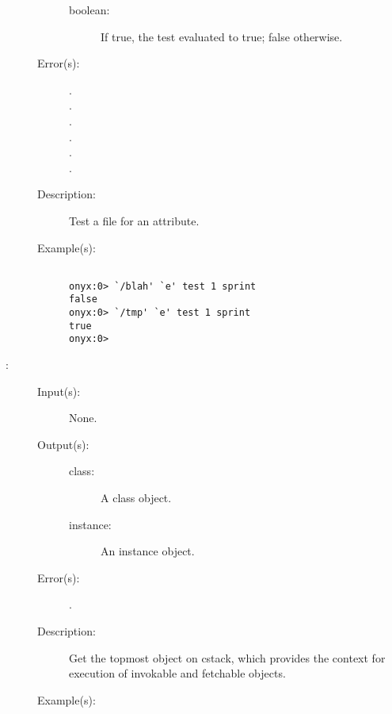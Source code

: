 \begin{description}
\begin{description}
		\begin{description}\item[]
		\item[boolean: ]
			If true, the test evaluated to true; false otherwise.
		\end{description}
	\item[Error(s): ]
		\begin{description}\item[]
		\item[.]
		\item[.]
		\item[.]
		\item[.]
		\item[.]
		\item[.]
		\end{description}
	\item[Description: ]
		Test a file for an attribute.
	\item[Example(s): ]\begin{verbatim}

onyx:0> `/blah' `e' test 1 sprint
false
onyx:0> `/tmp' `e' test 1 sprint
true
onyx:0>
		\end{verbatim}
	\end{description}
\label{systemdict:this}
\item[{\onyxop{--}{this}{class/instance}}: ]
	\begin{description}\item[]
	\item[Input(s): ] None.
	\item[Output(s): ]
		\begin{description}\item[]
		\item[class: ] A class object.
		\item[instance: ] An instance object.
		\end{description}
	\item[Error(s): ]
		\begin{description}\item[]
		\item[.]
		\end{description}
	\item[Description: ]
		Get the topmost object on cstack, which provides the context for
		execution of invokable and fetchable objects.
	\item[Example(s): ]\begin{verbatim}


\end{verbatim}
\end{description}
\end{description}
